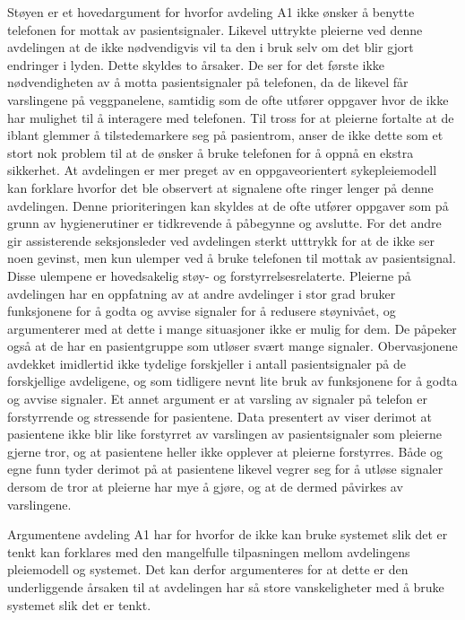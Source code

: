 \noindent
Støyen er et hovedargument for hvorfor avdeling A1 ikke ønsker å benytte telefonen for mottak av pasientsignaler. Likevel uttrykte pleierne ved denne avdelingen at de ikke nødvendigvis vil ta den i bruk selv om det blir gjort endringer i lyden. Dette skyldes to årsaker. De ser for det første ikke nødvendigheten av å motta pasientsignaler på telefonen, da de likevel får varslingene på veggpanelene, samtidig som de ofte utfører oppgaver hvor de ikke har mulighet til å interagere med telefonen. Til tross for at pleierne fortalte at de iblant glemmer å tilstedemarkere seg på pasientrom, anser de ikke dette som et stort nok problem til at de ønsker å bruke telefonen for å oppnå en ekstra sikkerhet. At avdelingen er mer preget av en oppgaveorientert sykepleiemodell kan forklare hvorfor det ble observert at signalene ofte ringer lenger på denne avdelingen. Denne prioriteringen kan skyldes at de ofte utfører oppgaver som på grunn av hygienerutiner er tidkrevende å påbegynne og avslutte. For det andre gir assisterende seksjonsleder ved avdelingen sterkt utttrykk for at de ikke ser noen gevinst, men kun ulemper ved å bruke telefonen til mottak av pasientsignal. Disse ulempene er hovedsakelig støy- og forstyrrelsesrelaterte. Pleierne på avdelingen har en oppfatning av at andre avdelinger i stor grad bruker funksjonene for å godta og avvise signaler for å redusere støynivået, og argumenterer med at dette i mange situasjoner ikke er mulig for dem. De påpeker også at de har en pasientgruppe som utløser svært mange signaler. Obervasjonene avdekket imidlertid ikke tydelige forskjeller i antall pasientsignaler på de forskjellige avdeligene, og som tidligere nevnt lite bruk av funksjonene for å godta og avvise signaler.
Et annet argument er at varsling av signaler på telefon er forstyrrende og stressende for pasientene. Data presentert av \citet{Rygh13} viser derimot at pasientene ikke blir like forstyrret av varslingen av pasientsignaler som pleierne gjerne tror, og at pasientene heller ikke opplever at pleierne forstyrres. Både \citet{Rygh13} og egne funn tyder derimot på at pasientene likevel vegrer seg for å utløse signaler dersom de tror at pleierne har mye å gjøre, og at de dermed påvirkes av varslingene.

\noindent
Argumentene avdeling A1 har for hvorfor de ikke kan bruke systemet slik det er tenkt kan forklares med den mangelfulle tilpasningen mellom avdelingens pleiemodell og systemet. Det kan derfor argumenteres for at dette er den underliggende årsaken til at avdelingen har så store vanskeligheter med å bruke systemet slik det er tenkt. 

